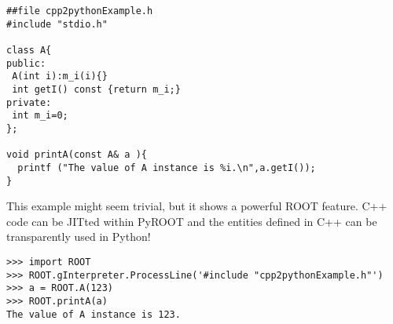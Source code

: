\documentclass{article}
\begin{document}
\begin{verbatim}
##file cpp2pythonExample.h
#include "stdio.h"

class A{
public:
 A(int i):m_i(i){}
 int getI() const {return m_i;}
private:
 int m_i=0;
};

void printA(const A& a ){
  printf ("The value of A instance is %i.\n",a.getI());
}
\end{verbatim}

This example might seem trivial, but it shows a powerful ROOT feature.
C++ code can be JITted within PyROOT and the entities defined in C++ can
be transparently used in Python!

\begin{verbatim}
>>> import ROOT
>>> ROOT.gInterpreter.ProcessLine('#include "cpp2pythonExample.h"')
>>> a = ROOT.A(123)
>>> ROOT.printA(a)
The value of A instance is 123.
\end{verbatim}


    
    
    
    
\end{document}
